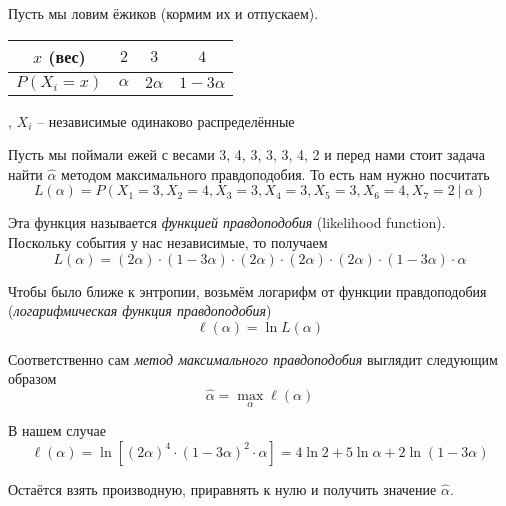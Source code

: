 \documentclass{article}
\begin{document}
\begin{example}
    Пусть мы ловим ёжиков (кормим их и отпускаем).

    \begin{center}
        \begin{tabular}{|c|c|c|c|}
            \hline
            $x$ (вес)    & $2$      & $3$       & $4$            \\ \hline
            $P(X_i = x)$ & $\alpha$ & $2\alpha$ & $1 - 3\alpha$ \\ \hline
        \end{tabular}, \quad $X_i$ -- независимые одинаково распределённые
    \end{center}

    Пусть мы поймали ежей с весами 3, 4, 3, 3, 3, 4, 2 и перед нами стоит задача найти $\hat \alpha$ методом максимального правдоподобия. То есть нам нужно посчитать
    \[
        L(\alpha) = P\left( X_1=3, X_2=4, X_3=3, X_4=3, X_5=3, X_6=4, X_7=2\ |\ \alpha \right)
    \]

    Эта функция называется \textit{функцией правдоподобия} (likelihood function). Поскольку события у нас независимые, то получаем
    \[
        L(\alpha) = (2\alpha) \cdot (1 - 3\alpha) \cdot (2\alpha) \cdot (2\alpha) \cdot (2\alpha) \cdot (1 - 3\alpha) \cdot \alpha
    \]

    Чтобы было ближе к энтропии, возьмём логарифм от функции правдоподобия (\textit{логарифмическая функция правдоподобия})
    \[
        \ell(\alpha) = \ln L(\alpha)  
    \]

    Соответственно сам \textit{метод максимального правдоподобия} выглядит следующим образом
    \[
        \hat \alpha = \max_\alpha \ell(\alpha)
    \]

    В нашем случае
    \[
        \ell(\alpha) = \ln \left[ (2\alpha)^4 \cdot (1 - 3\alpha)^2 \cdot \alpha \right] = 4\ln 2 + 5\ln\alpha + 2\ln(1 - 3\alpha)
    \]

    Остаётся взять производную, приравнять к нулю и получить значение $\hat \alpha$.
\end{example}
\end{document}

